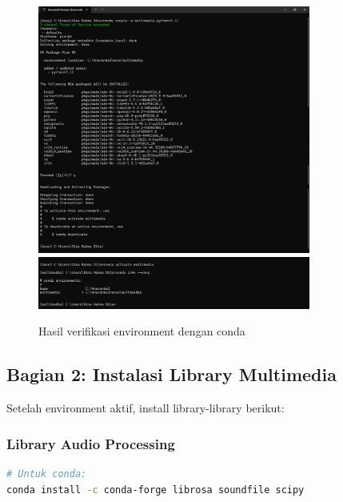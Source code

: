 \documentclass[11pt,a4paper]{article}
\begin{document}
\begin{figure}[h!]
    \centering
    \includegraphics[width=0.8\textwidth]{Figure/ss/1.png}
    \includegraphics[width=0.8\textwidth]{Figure/ss/2.png}
    \caption{Hasil verifikasi environment dengan conda}
    \label{fig:test_env}
\end{figure}

\subsection{Bagian 2: Instalasi Library Multimedia}
Setelah environment aktif, install library-library berikut:

\subsubsection{Library Audio Processing}
\begin{lstlisting}[language=bash, caption=Instalasi library audio]
# Untuk conda:
conda install -c conda-forge librosa soundfile scipy
\end{lstlisting}
\end{document}
